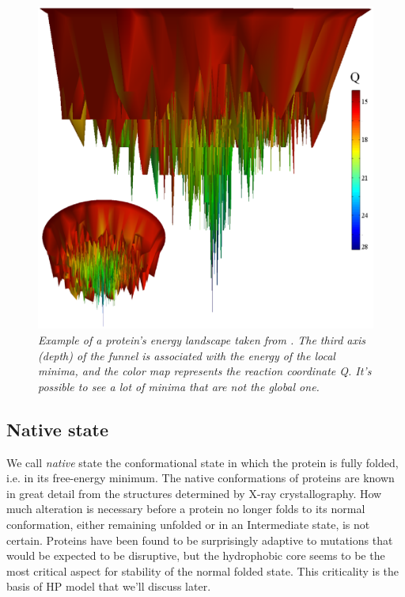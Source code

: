 \begin{figure}[H]
    \centering
    \includegraphics[width=.75\textwidth]{./img/energy_landscape.png}
    \caption{\emph{Example of a protein's energy landscape taken from \cite{energyLandscape}.
                The third axis (depth) of the funnel is associated with the energy of the local minima, and the color map represents the reaction coordinate Q.
                It's possible to see a lot of minima that are not the global one.}}
    \label{fig:energy_landscape}
\end{figure}

\subsection{Native state}
We call \emph{native} state the conformational state in which the protein is fully folded, i.e. in its free-energy minimum.
The native conformations of proteins are known in great detail from the structures determined by X-ray crystallography.
How much alteration is necessary before a protein no longer folds to its normal conformation, either remaining unfolded or in an Intermediate state, is not certain.
Proteins have been found to be surprisingly adaptive to mutations that would be expected to be disruptive, but the hydrophobic core seems to be the most critical aspect for stability of the normal folded state.
This criticality is the basis of HP model that we'll discuss later.

